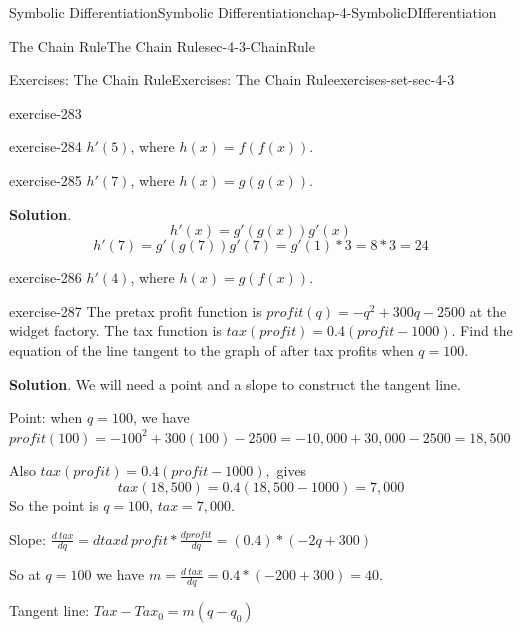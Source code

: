 \documentclass[oneside,10pt,]{book}
\numberwithin{equation}{section}
\begin{document}
\begin{chapterptx}{Symbolic Differentiation}{}{Symbolic Differentiation}{}{}{chap-4-SymbolicDIfferentiation}
\begin{sectionptx}{The Chain Rule}{}{The Chain Rule}{}{}{sec-4-3-ChainRule}
\begin{exercises-subsection-numberless}{Exercises: The Chain Rule}{}{Exercises: The Chain Rule}{}{}{exercises-set-sec-4-3}
\begin{divisionexercise}{15}{}{}{exercise-283}
\end{divisionexercise}%
\begin{divisionexercise}{16}{}{}{exercise-284}%
\hypertarget{p-1681}{}%
\(h'(5)\), where \(h(x)=f(f(x))\).%
\end{divisionexercise}%
\begin{divisionexercise}{17}{}{}{exercise-285}%
\hypertarget{p-1682}{}%
\(h'(7)\), where \(h(x)=g(g(x))\).%
\par\smallskip%
\noindent\textbf{Solution}.\hypertarget{solution-142}{}\quad%
%
\begin{equation*}
h' (x)=g' (g(x))  g' (x)
\end{equation*}
%
\begin{equation*}
h' (7)=g' (g(7))  g' (7)
=g' (1)*3
=8*3=24
\end{equation*}
\end{divisionexercise}%
\begin{divisionexercise}{18}{}{}{exercise-286}%
\hypertarget{p-1683}{}%
\(h'(4)\), where \(h(x)=g(f(x))\).%
\end{divisionexercise}%
\begin{divisionexercise}{19}{}{}{exercise-287}%
\hypertarget{p-1684}{}%
The pretax profit function is \(profit(q)=-q^2+300q-2500\) at the widget factory. The tax function is \(tax(profit)=0.4(profit-1000)\).  Find the equation of the line tangent to the graph of after tax profits when \(q=100\).%
\par\smallskip%
\noindent\textbf{Solution}.\hypertarget{solution-143}{}\quad%
\hypertarget{p-1685}{}%
We will need a point and a slope to construct the tangent line.%
\par
\hypertarget{p-1686}{}%
Point: when \(q=100\), we have \(profit(100)=-100^2+300(100)-2500
=-10,000+30,000-2500=18,500\)%
\par
\hypertarget{p-1687}{}%
Also \(tax(profit)=0.4(profit-1000),\) gives%
%
\begin{equation*}
tax(18,500)=0.4(18,500-1000)= 7,000
\end{equation*}
\hypertarget{p-1688}{}%
So the point is \(q = 100\), \(tax = 7,000\).%
\par
\hypertarget{p-1689}{}%
Slope: \(\frac{d\ tax}{dq}=  {d tax}{d\ profit}
*\frac{d profit}{dq}=(0.4)*(-2q+300)\)%
\par
\hypertarget{p-1690}{}%
So at \(q =100\) we have \(m=\frac{d\ tax}{dq}= 0.4*(-200+300)= 40\).%
\par
\hypertarget{p-1691}{}%
Tangent line: \(Tax-Tax_0=m(q-q_0)\)%
\par

\end{divisionexercise}
\end{exercises-subsection-numberless}
\end{sectionptx}
\end{chapterptx}
\end{document}
